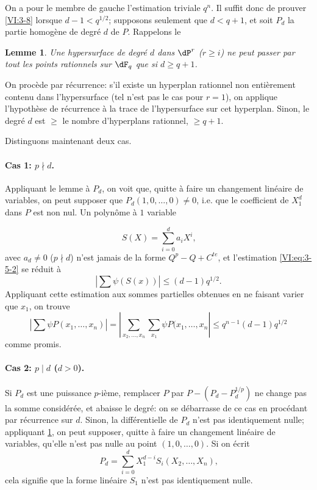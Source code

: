 \documentclass[oneside]{book}
\theoremstyle{sga-source}
\theoremstyle{sga-source-dash}
\theoremstyle{sga-source-dotdash}
\theoremstyle{sga-source-number-note-dash}
\theoremstyle{sga-source-note-number-dotdash}
\theoremstyle{sga-source-example-dotdash}
\theoremstyle{sga-source-inline-number}
\theoremstyle{sga-source-bare-number}
\theoremstyle{sga-source}
\newtheorem{lemma_}[subsection]{Lemme}
\newcommand{\PrintPage}[1]{}\newcommand{\MathPage}[1]{}\newcommand{\PrintCite}[2]{#1}\newcommand{\var}[3]{#1}
\begin{document}
On a pour le membre de gauche l'estimation triviale $q^n$. Il suffit donc de 
prouver \ref{VI:3-8} lorsque $d-1<q^{1/2}$; supposons seulement que 
$d<q+1$, et soit $P_d$ la partie homogène de degré $d$ de $P$. Rappelons le 





\begin{lemma_}\label{VI:3-9}
Une hypersurface de degré $d$ dans $\dP^r$ (\var{$r\geqslant i$}{$r\geqslant 1$}{S45-SOL-0786}) ne peut passer 
\var{par tout les points}{par tous les points}{S45-SOL-0787} rationnels sur $\dF_q$ que si $d\geqslant q+1$. 
\end{lemma_}

On procède par récurrence: s'il existe un hyperplan rationnel non 
entièrement contenu dans l'hypersurface (tel n'est pas le cas pour $r=1$), on 
applique l'hypothèse de récurrence à la trace de l'hypersurface sur cet 
hyperplan. Sinon, le degré $d$ est $\geqslant$ le nombre d'\var{hyperplans rationnel}{hyperplans rationnels}{S45-SOL-0789}, $\geqslant q+1$. 

Distinguons maintenant deux cas. 


\paragraph{Cas 1: $p\nmid d$.}
Appliquant le lemme à $P_d$, on voit que, quitte à faire un changement 
linéaire de variables, on peut supposer que $P_d(1,0,\ldots,0)\ne 0$, i.e. 
que le coefficient de $X_1^d$ dans $P$ est non nul. Un polynôme à $1$ 
variable 
\PrintPage{194}
\[
  S(X) = \sum_{i=0}^d a_i X^i \text{,} 
\]
avec $a_d\ne 0$ ($p\nmid d$) n'est jamais de la forme $Q^p-Q+C^{t e}$, et 
l'estimation \eqref{VI:eq:3-5-2} se réduit à 
\[
  \left| \sum \psi(S(x)) \right| \leqslant (d-1) q^{1/2} \text{.} 
\]
Appliquant cette estimation aux sommes partielles obtenues en ne faisant varier 
que $x_1$, on trouve 
\[
  \left| \sum \psi P(x_1,\dots,x_n) \right| = \left| \var{\sum_{x_2,\dots,x_n} \sum_{x_1} \psi P(x_1,\dots,x_n\right|}{\sum_{x_2,\dots,x_n} \sum_{x_1} \psi P(x_1,\dots,x_n)\right|}{S45-SOL-0792} \leqslant q^{n-1} (d-1) q^{1/2} 
\]
comme promis. 


\paragraph{Cas 2: $p\mid d$ ($d>0$).}
Si $P_d$ est une puissance $p$-ième, remplacer $P$ par $P-(P_d-P_d^{1/p})$ ne 
change pas la somme considérée, et abaisse le degré: on se débarrasse de 
ce cas en procédant par récurrence sur $d$. Sinon, la différentielle de 
$P_d$ n'est pas identiquement nulle; appliquant \ref{VI:3-9}, on peut supposer, 
quitte à faire un changement linéaire de variables, qu'elle n'est pas nulle 
au point $(1,0,\dots,0)$. Si on écrit 
\[
  P_d = \sum_{i=0}^d X_1^{d-i} S_i(X_2,\dots,X_n) \text{,} 
\]
cela signifie que la forme linéaire $S_1$ n'est pas identiquement nulle. 
\end{document}

